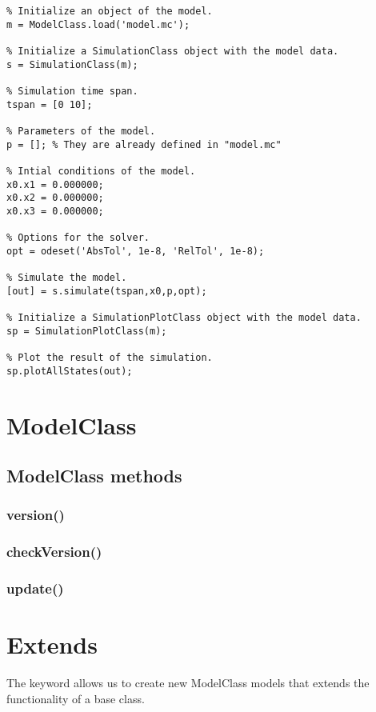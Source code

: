 \documentclass[11pt]{article}
\begin{document}
\begin{lstlisting}
% Initialize an object of the model.
m = ModelClass.load('model.mc');

% Initialize a SimulationClass object with the model data.
s = SimulationClass(m);

% Simulation time span.
tspan = [0 10];

% Parameters of the model.
p = []; % They are already defined in "model.mc"

% Intial conditions of the model.
x0.x1 = 0.000000;
x0.x2 = 0.000000;
x0.x3 = 0.000000;

% Options for the solver.
opt = odeset('AbsTol', 1e-8, 'RelTol', 1e-8);

% Simulate the model.
[out] = s.simulate(tspan,x0,p,opt);

% Initialize a SimulationPlotClass object with the model data.
sp = SimulationPlotClass(m);

% Plot the result of the simulation.
sp.plotAllStates(out);
\end{lstlisting}

\section{ModelClass}

\subsection{ModelClass methods}

\subsubsection{version()}

\subsubsection{checkVersion()}

\subsubsection{update()}

\section{Extends}

The keyword  allows us to create new ModelClass models that extends the functionality of a base class.
\end{document}
